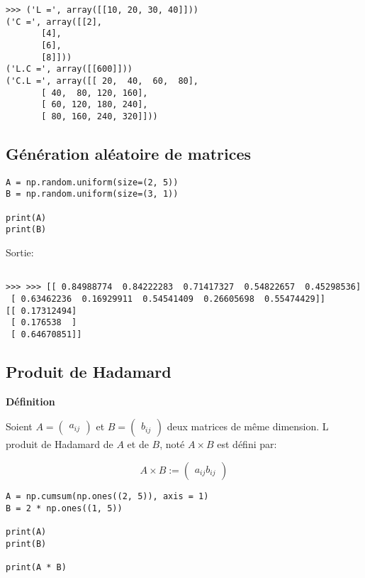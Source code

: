 \documentclass[11pt]{article}
\begin{document}
\begin{verbatim}
>>> ('L =', array([[10, 20, 30, 40]]))
('C =', array([[2],
       [4],
       [6],
       [8]]))
('L.C =', array([[600]]))
('C.L =', array([[ 20,  40,  60,  80],
       [ 40,  80, 120, 160],
       [ 60, 120, 180, 240],
       [ 80, 160, 240, 320]]))
\end{verbatim}

\subsection{Génération aléatoire de matrices}
\label{sec-1-3}

\begin{verbatim}
A = np.random.uniform(size=(2, 5))
B = np.random.uniform(size=(3, 1))

print(A)
print(B)
\end{verbatim}

Sortie:

\begin{verbatim}

>>> >>> [[ 0.84988774  0.84222283  0.71417327  0.54822657  0.45298536]
 [ 0.63462236  0.16929911  0.54541409  0.26605698  0.55474429]]
[[ 0.17312494]
 [ 0.176538  ]
 [ 0.64670851]]
\end{verbatim}

\subsection{Produit de Hadamard}
\label{sec-1-4}

\textbf{Définition}

Soient $A=\begin{pmatrix}a_{ij}\end{pmatrix}$ et
$B=\begin{pmatrix}b_{ij}\end{pmatrix}$ deux matrices de même dimension. L
produit de Hadamard de $A$ et de $B$, noté $A\times B$ est défini par:

\begin{equation}
A\times B := \begin{pmatrix}a_{ij}b_{ij}\end{pmatrix}
\end{equation}

\begin{verbatim}
A = np.cumsum(np.ones((2, 5)), axis = 1)
B = 2 * np.ones((1, 5))

print(A)
print(B)

print(A * B)
\end{verbatim}
\end{document}
